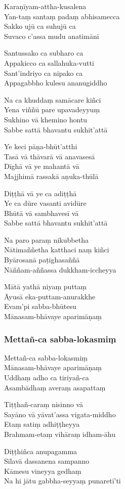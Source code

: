 \begin{paritta}

Karaṇīyam-attha-kusalena\\
Yan-taṃ santaṃ padaṃ abhisamecca\\
Sakko ujū ca suhujū ca\\
Suvaco c'assa mudu anatimānī

Santussako ca subharo ca\\
Appakicco ca sallahuka-vutti\\
Sant'indriyo ca nipako ca\\
Appagabbho kulesu ananugiddho

Na ca khuddaṃ samācare kiñci\\
Yena viññū pare upavadeyyuṃ\\
Sukhino vā khemino hontu\\
Sabbe sattā bhavantu sukhit'attā

Ye keci pāṇa-bhūt'atthi\\
Tasā vā thāvarā vā anavasesā\\
Dīghā vā ye mahantā vā\\
Majjhimā rassakā aṇuka-thūlā

Diṭṭhā vā ye ca adiṭṭhā\\
Ye ca dūre vasanti avidūre\\
Bhūtā vā sambhavesī vā\\
Sabbe sattā bhavantu sukhit'attā

Na paro paraṃ nikubbetha\\
Nātimaññetha katthaci naṃ kiñci\\
Byārosanā paṭighasaññā\\
Nāññam-aññassa dukkham-iccheyya

Mātā yathā niyaṃ puttaṃ\\
Āyusā eka-puttam-anurakkhe\\
Evam'pi sabba-bhūtesu\\
Mānasam-bhāvaye aparimāṇaṃ

\subsubsection{Mettañ-ca sabba-lokasmiṃ}


Mettañ-ca sabba-lokasmiṃ\\
Mānasam-bhāvaye aparimāṇaṃ\\
Uddhaṃ adho ca tiriyañ-ca\\
Asambādhaṃ averaṃ asapattaṃ

Tiṭṭhañ-caraṃ nisinno vā\\
Sayāno vā yāvat'assa vigata-middho\\
Etaṃ satiṃ adhiṭṭheyya\\
Brahmam-etaṃ vihāraṃ idham-āhu

Diṭṭhiñca anupagamma\\
Sīlavā dassanena sampanno\\
Kāmesu vineyya gedhaṃ\\
Na hi jātu gabbha-seyyaṃ punaretī'ti


\end{paritta}

